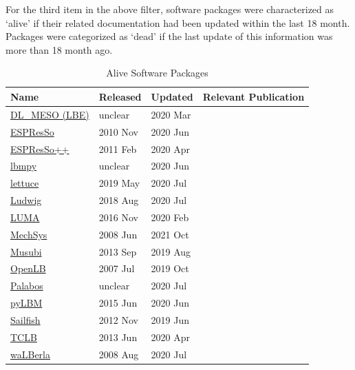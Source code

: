 \documentclass[final, 3p, times, authoryear]{elsarticle}
\begin{document}
For the third item in the above filter, software packages were characterized as
`alive' if their related documentation had been updated within the last 18
month. Packages were categorized as `dead' if the last update of this
information was more than 18 month ago.

\begin{table}
	\begin{center}
		\begin{tabular}{ p{3cm}p{2cm}p{2cm}p{5.5cm} }
			\toprule
			Name & Released & Updated & Relevant Publication\\
			\midrule
			\href{https://www.ccp5.ac.uk/sites/www.ccp5.ac.uk/files/dl_meso/data/dl_meso_2.7.zip}{DL\_MESO (LBE)} & unclear & 2020 Mar&\citep{seaton2013dlmeso}\\
			\href{https://github.com/espressomd/espresso}{ESPResSo} & 2010 Nov & 2020 Jun&\citep{weik2019espresso}\\
			\href{https://github.com/espressopp/espressopp}{ESPResSo++} & 2011 Feb & 2020 Apr&\citep{halverson2013espresso++}\\
			\href{https://github.com/mabau/lbmpy}{lbmpy}& unclear  & 2020 Jun & \citep{bauer2021lbmpy}\\
			\href{https://github.com/Olllom/lettuce}{lettuce} & 2019 May & 2020 Jul&\citep{bedrunka2021lettuce}\\
			\href{https://github.com/ludwig-cf/ludwig}{Ludwig} & 2018 Aug & 2020 Jul&\citep{desplat2001ludwig}\\
			\href{https://github.com/aharwood2/LUMA}{LUMA} & 2016 Nov   & 2020 Feb &\citep{harwood2018luma}\\
			\href{http://hg.savannah.gnu.org/hgweb/mechsys/file/tip/}{MechSys} & 2008 Jun    & 2021 Oct &\citep{galindo2013coupled}\\
			\href{https://osdn.net/projects/apes/scm/hg/musubi/}{Musubi} & 2013 Sep & 2019 Aug &\citep{hasert2014complex}\\
			\href{https://www.openlb.net/download/}{OpenLB} & 2007 Jul & 2019 Oct &\citep{heuveline2010openlb}\\
			\href{https://gitlab.com/unigespc/palabos}{Palabos} & unclear & 2020 Jul &\citep{latt2021palabos}\\
			\href{https://github.com/pylbm/pylbm}{pyLBM} & 2015 Jun&   2020 Jun &\\
			\href{https://github.com/sailfish-team/sailfish}{Sailfish} & 2012 Nov & 2019 Jun & \citep{januszewski2014sailfish}\\
			\href{https://github.com/CFD-GO/TCLB}{TCLB} & 2013 Jun  & 2020 Apr & \citep{rokicki2016adjoint}\\
			\href{https://i10git.cs.fau.de/walberla/walberla}{waLBerla} & 2008 Aug & 2020 Jul & \citep{bauer2021walberla}\\
			\bottomrule
		\end{tabular}
		\caption{Alive Software Packages} \label{alivepackages}
	\end{center}
\end{table}
\end{document}
